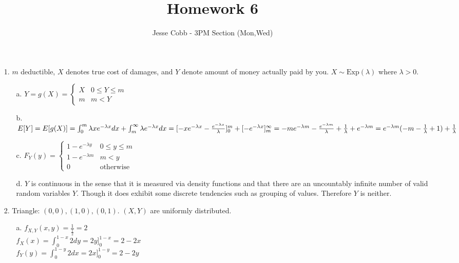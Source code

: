 \documentclass[11pt]{amsart}
\theoremstyle{definition}
\begin{document}
\title{Homework 6}

\author{Jesse Cobb - 3PM Section (Mon,Wed)}

\maketitle

\begin{itemize}

\item[1.] $m$ deductible, $X$ denotes true cost of damages, and $Y$ denote amount of money actually paid by you. $X\sim\text{Exp}(\lambda)$ where $\lambda > 0$. 
\begin{itemize}
    \item[a.] $Y=g(X)=\begin{cases}
        X &0\le Y\le m\\
        m &m<Y
    \end{cases}$

    \item[b.] $E[Y]=E[g(X)]=\int_0^m\lambda xe^{-\lambda x}dx+\int_m^\infty \lambda e^{-\lambda x}dx\\
              =[-xe^{-\lambda x}-\frac{e^{-\lambda x}}{\lambda}]_0^m+[-e^{-\lambda x}]_m^\infty \\
              =-me^{-\lambda m}-\frac{e^{-\lambda m}}{\lambda}+\frac1\lambda+e^{-\lambda m} \\
              =e^{-\lambda m}(-m-\frac{1}{\lambda}+1)+\frac1\lambda$

    \item[c.] $F_Y(y)=\begin{cases}
        1-e^{-\lambda y} &0\le y\le m\\
        1-e^{-\lambda m}&m<y \\
        0 &\text{otherwise}
    \end{cases}$

    \item[d.] $Y$ is continuous in the sense that it is measured via density functions and that there are an uncountably infinite number of valid random variables $Y$. Though it does exhibit some discrete tendencies such as grouping of values. Therefore $Y$ is neither.
    
\end{itemize}

\item[2.] Triangle: $(0,0),(1,0),(0,1)$. $(X,Y)$ are uniformly distributed.
\begin{itemize}
    \item[a.] $f_{X,Y}(x,y)=\frac{1}{\frac 12}=2$ \\
              $f_X(x)=\int_0^{1-x}2dy=2y]_0^{1-x}=2-2x$ \\
              $f_Y(y)=\int_0^{1-y}2dx=2x]_0^{1-y}=2-2y$


\end{itemize}
\end{itemize}
\end{document}
